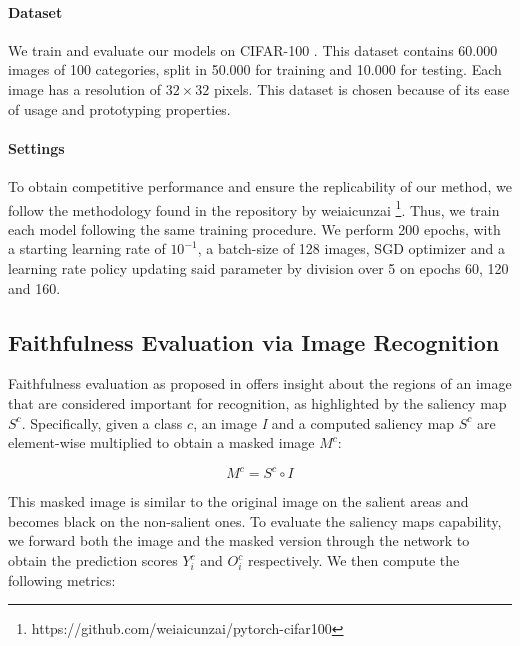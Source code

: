 \paragraph{Dataset}
We train and evaluate our models on CIFAR-100 \cite{krizhevsky2009learning}. This dataset contains 60.000 images of 100 categories, split in 50.000 for training and 10.000 for testing. Each image has a resolution of $32\times32$ pixels. This dataset is chosen because of its ease of usage and prototyping properties. 

\paragraph{Settings}
To obtain competitive performance and ensure the replicability of our method, we follow the methodology found in the repository by weiaicunzai \footnote{https://github.com/weiaicunzai/pytorch-cifar100}. Thus, we train each model following the same training procedure. We perform 200 epochs, with a starting learning rate of $10^{-1}$, a batch-size of 128 images, SGD optimizer and a learning rate policy updating said parameter by division over 5 on epochs 60, 120 and 160.  

\subsection{Faithfulness Evaluation via Image Recognition}
Faithfulness evaluation as proposed in \cite{gradcampp} offers insight about the regions of an image that are considered important for recognition, as highlighted by the saliency map $S^c$. 
Specifically, given a class $c$, an image \textit{I} and a computed saliency map $S^c$ are element-wise multiplied to obtain a masked image $M^c$:

\begin{equation*}
    M^c = S^c\circ I
\end{equation*}

This masked image is similar to the original image on the salient areas and becomes black on the non-salient ones.
To evaluate the saliency maps capability, we forward both the image and the masked version through the network to obtain the prediction scores \textit{$Y_i^c$} and \textit{$O_i^c$} respectively. We then compute the following metrics:

